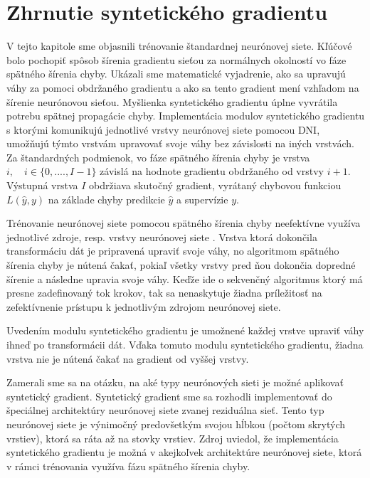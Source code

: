 \section{Zhrnutie syntetického gradientu}
\label{SGzhrnutie}
V tejto kapitole sme objasnili trénovanie štandardnej neurónovej siete. Kľúčové bolo pochopiť spôsob šírenia gradientu sieťou za normálnych okolností vo fáze spätného šírenia chyby. Ukázali sme matematické vyjadrenie, ako sa upravujú váhy za pomoci obdržaného gradientu a ako sa tento gradient mení vzhľadom na šírenie neurónovou sieťou. Myšlienka syntetického gradientu úplne vyvrátila potrebu spätnej propagácie chyby. Implementácia modulov syntetického gradientu s ktorými komunikujú jednotlivé vrstvy neurónovej siete pomocou DNI, umožňujú týmto vrstvám upravovať svoje váhy bez závislosti na iných vrstvách. Za štandardných podmienok, vo fáze spätného šírenia chyby je vrstva $i,\quad i \in \{0,....,I-1\}$ závislá na hodnote gradientu obdržaného od vrstvy $i+1$. Výstupná vrstva $I$ obdržiava skutočný gradient, vyrátaný chybovou funkciou $L(\hat{y}, y)$ na základe chyby predikcie $\hat{y}$ a supervízie $y$. 

Trénovanie neurónovej siete pomocou spätného šírenia chyby neefektívne využíva jednotlivé zdroje, resp. vrstvy neurónovej siete \cite{Jaderberg2016}. Vrstva ktorá dokončila transformáciu dát je pripravená upraviť svoje váhy, no algoritmom spätného šírenia chyby je nútená čakať, pokiaľ všetky vrstvy pred ňou dokončia dopredné šírenie a následne upravia svoje váhy. Keďže ide o sekvenčný algoritmus ktorý má presne zadefinovaný tok krokov, tak sa nenaskytuje žiadna príležitosť na zefektívnenie prístupu k jednotlivým zdrojom neurónovej siete. 

Uvedením modulu syntetického gradientu je umožnené každej vrstve upraviť váhy ihneď po transformácii dát. Vďaka tomuto modulu syntetického gradientu, žiadna vrstva nie je nútená čakať na gradient od vyššej vrstvy.  

Zamerali sme sa na otázku, na aké typy neurónových sieti je možné aplikovať syntetický gradient. Syntetický gradient sme sa rozhodli implementovať do špeciálnej architektúry neurónovej siete zvanej reziduálna sieť. Tento typ neurónovej siete je výnimočný predovšetkým svojou hĺbkou (počtom skrytých vrstiev), ktorá sa ráta až na stovky vrstiev. Zdroj \cite{Jaderberg2016} uviedol, že implementácia syntetického gradientu je možná v akejkoľvek architektúre neurónovej siete, ktorá v rámci trénovania využíva fázu spätného šírenia chyby. 

